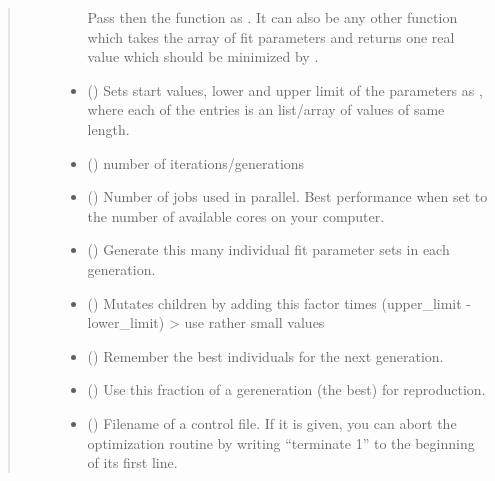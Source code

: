\documentclass[letterpaper,10pt,english]{sphinxmanual}
\begin{document}
\begin{fulllineitems}
\begin{quote}
\begin{description}
\begin{itemize}
Pass then the function  as . It can also be any other function which takes the array of fit parameters and returns one real value which should be minimized by .


\item {} 
 () \textendash{} Sets start values, lower and upper limit of the parameters as , where each of the entries is an list/array of values of same length.

\item {} 
 () \textendash{} number of iterations/generations

\item {} 
 () \textendash{} Number of jobs used in parallel. Best performance when set to the number of available cores on your computer.

\item {} 
 () \textendash{} Generate this many individual fit parameter sets in each generation.

\item {} 
 () \textendash{} Mutates children by adding this factor times (upper\_limit - lower\_limit)  \textendash{}\textgreater{} use rather small values

\item {} 
 () \textendash{} Remember the best individuals for the next generation.

\item {} 
 () \textendash{} Use this fraction of a gereneration (the best) for reproduction.

\item {} 
 () \textendash{} Filename of a control file. If it is given, you can abort the optimization routine by writing “terminate 1” to the beginning of its first line.


\end{itemize}
\end{description}
\end{quote}
\end{fulllineitems}
\end{document}
